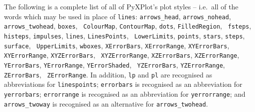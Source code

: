 The following is a complete list of all of PyXPlot's plot styles -- i.e.\ all
of the words which may be used in place of {\tt lines}: {\tt arrows\_\-head},
{\tt arrows\_\-no\-head}, {\tt arrows\_\-two\-head}, {\tt boxes}, {\tt
Colour\-Map}, {\tt Contour\-Map}, {\tt dots}, {\tt Filled\-Region}, {\tt
fsteps}, {\tt histeps}, {\tt impulses}, {\tt lines}, {\tt Lines\-Points}, {\tt
Lower\-Limits}, {\tt points}, {\tt stars}, {\tt steps}, {\tt surface}, {\tt
Upper\-Limits}, {\tt wbox\-es}, {\tt X\-Error\-Bars}, {\tt X\-Error\-Range},
{\tt XY\-Error\-Bars}, {\tt XY\-Error\-Range}, {\tt XYZ\-Error\-Bars}, {\tt
XYZ\-Error\-Range}, {\tt XZ\-Error\-Bars}, {\tt XZ\-Error\-Range}, {\tt
Y\-Error\-Bars}, {\tt Y\-Error\-Range}, {\tt Y\-Error\-Shaded}, {\tt
YZ\-Error\-Bars}, {\tt YZ\-Error\-Range}, {\tt Z\-Error\-Bars}, {\tt
Z\-Error\-Range}. In addition, {\tt lp} and {\tt pl} are recognised as
abbreviations for {\tt lines\-points}; {\tt error\-bars} is recognised as an
abbreviation for {\tt y\-error\-bars}; {\tt error\-range} is recognised as an
abbreviation for {\tt y\-error\-range}; and {\tt arrows\_\-two\-way} is
recognised as an alternative for {\tt arrows\_\-two\-head}.

